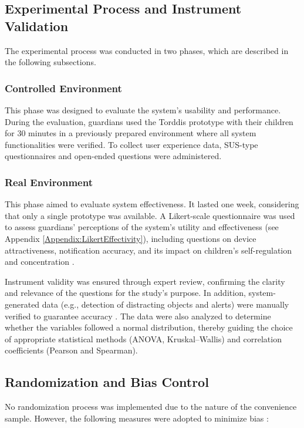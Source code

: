                 \subsection{Experimental Process and Instrument Validation}
                The experimental process was conducted in two phases, which are described in the following subsections.
                
                \subsubsection{Controlled Environment}
                This phase was designed to evaluate the system’s usability and performance. During the evaluation, guardians used the Torddis prototype with their children for 30 minutes in a previously prepared environment where all system functionalities were verified. To collect user experience data, SUS-type questionnaires and open-ended questions were administered.
                
                \subsubsection{Real Environment}
                This phase aimed to evaluate system effectiveness. It lasted one week, considering that only a single prototype was available. A Likert-scale questionnaire was used to assess guardians' perceptions of the system’s utility and effectiveness (see Appendix \ref{Appendix:LikertEffectivity}), including questions on device attractiveness, notification accuracy, and its impact on children's self-regulation and concentration \citep{Ackermans2025Young}.
                
                Instrument validity was ensured through expert review, confirming the clarity and relevance of the questions for the study’s purpose. In addition, system-generated data (e.g., detection of distracting objects and alerts) were manually verified to guarantee accuracy \citep{Wang2025Development}. The data were also analyzed to determine whether the variables followed a normal distribution, thereby guiding the choice of appropriate statistical methods (ANOVA, Kruskal–Wallis) and correlation coefficients (Pearson and Spearman).
                
                \subsection{Randomization and Bias Control}
                No randomization process was implemented due to the nature of the convenience sample. However, the following measures were adopted to minimize bias \citep{Huang2025How}:
                
